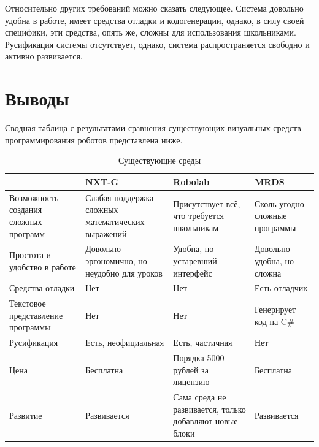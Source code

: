 \documentclass[a4paper]{article}
\begin{document}
Относительно других требований можно сказать следующее. Система довольно удобна в работе, имеет средства отладки и кодогенерации, однако, в силу своей специфики, эти средства, опять же, сложны для использования школьниками. Русификация системы отсутствует, однако, система распространяется свободно и активно развивается.

\section{Выводы}
Сводная таблица с результатами сравнения существующих визуальных средств программирования роботов представлена ниже.

\begin{table}[h]
  \centering
    \begin{tabular} {| p{} | p{} | p{} | p{} |}
      \hline
                                            & NXT-G                                             & Robolab                                                  & MRDS \\
      \hline
      Возможность создания сложных программ & Слабая поддержка сложных математических выражений & Присутствует всё, что требуется школьникам               & Сколь угодно сложные программы \\
      \hline
      Простота и удобство в работе          & Довольно эргономично, но неудобно для уроков      & Удобна, но устаревший интерфейс                          & Довольно удобна, но сложна \\
      \hline
      Средства отладки                      & Нет                                               & Нет                                                      & Есть отладчик \\
      \hline
      Текстовое представление программы     & Нет                                               & Нет                                                      & Генерирует код на C\# \\
      \hline      
      Русификация                           & Есть, неофициальная                               & Есть, частичная                                          & Нет \\
      \hline
      Цена                                  & Бесплатна                                         & Порядка 5000 рублей за лицензию                          & Бесплатна \\
      \hline
      Развитие                              & Развивается                                       & Сама среда не развивается, только добавляют новые блоки  & Развивается \\
      \hline
    \end{tabular}
  \caption{Существующие среды}
  \label{tab:existingTools}
\end{table}
\end{document}
